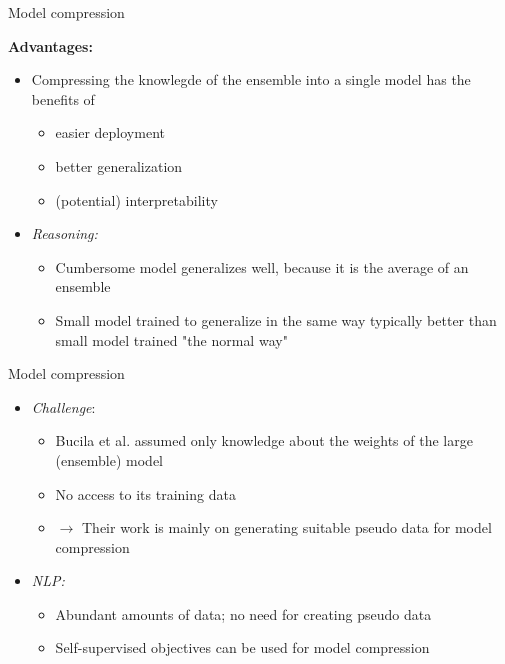 \begin{frame}{Model compression}

\vfill

\textbf{Advantages:}

\begin{itemize}
	\item Compressing the knowlegde of the ensemble into a single model has the benefits of
			\begin{itemize}
				\item easier deployment
				\item better generalization
				\item (potential) interpretability
			\end{itemize} 
	\item \textit{Reasoning:}
		\begin{itemize}
			\item Cumbersome model generalizes well, because it is the average of an ensemble
			\item Small model trained to generalize in the same way typically better than small model trained "the normal way"
		\end{itemize}
\end{itemize}

\vfill

\end{frame}


\begin{frame}{Model compression}

\vfill

\begin{itemize}
	\item \textit{Challenge}: 
			\begin{itemize}
				\item Bucila et al. assumed only knowledge about the weights of the large (ensemble) model
				\item No access to its training data
				\item[] $\to$ Their work is mainly on generating suitable pseudo data for model compression
			\end{itemize} 
	\item \textit{NLP:}
		\begin{itemize}
			\item Abundant amounts of data; no need for creating pseudo data
			\item Self-supervised objectives can be used for model compression
		\end{itemize}
\end{itemize}

\vfill

\end{frame}

